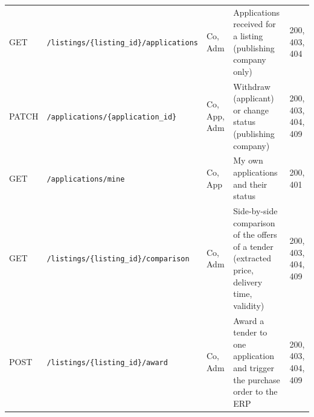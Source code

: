 {\begin{longtable}{L{1.3cm}L{5.0cm}L{1.6cm}L{4.4cm}L{1.9cm}}
GET & \texttt{/\allowbreak listings/\allowbreak \{listing\_id\}/\allowbreak applications} & Co, Adm & Applications received for a listing (publishing company only) & 200, 403, 404\\
PATCH & \texttt{/\allowbreak applications/\allowbreak \{application\_id\}} & Co, App, Adm & Withdraw (applicant) or change status (publishing company) & 200, 403, 404, 409\\
GET & \texttt{/\allowbreak applications/\allowbreak mine} & Co, App & My own applications and their status & 200, 401\\
GET & \texttt{/\allowbreak listings/\allowbreak \{listing\_id\}/\allowbreak comparison} & Co, Adm & Side-by-side comparison of the offers of a tender (extracted price, delivery time, validity) & 200, 403, 404, 409\\
POST & \texttt{/\allowbreak listings/\allowbreak \{listing\_id\}/\allowbreak award} & Co, Adm & Award a tender to one application and trigger the purchase order to the ERP & 200, 403, 404, 409\\
\hline
\end{longtable}}
